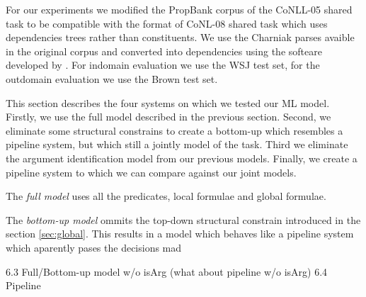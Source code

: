 
For our experiments we modified the PropBank corpus of the CoNLL-05 shared task 
\citep{carreras05introduction} to be compatible with the format of CoNL-08 
shared task \citep{surdeanu08conll} which uses dependencies trees rather than 
constituents. We use the Charniak parses avaible in the original corpus and 
converted into dependencies using the softeare developed by 
\citet{johansson07conversion}. For indomain evaluation we use the WSJ test set, 
for the outdomain evaluation we use the Brown test set. 

This section describes the four systems on which we tested our ML model.
Firstly, we use the full model described in the previous section. Second, we 
eliminate some structural constrains to create a bottom-up which resembles a 
pipeline system, but which still a jointly model of the task. Third we eliminate 
the argument identification model from our previous models. Finally, we create a 
pipeline system to which we can compare against our joint models.

The \emph{full model} uses all the predicates, local formulae and global 
formulae. 

The \emph{bottom-up model} ommits the top-down structural constrain introduced 
in the section \ref{sec:global}. This results in a model which behaves like a 
pipeline system which aparently pases the decisions mad  


6.3 Full/Bottom-up model w/o isArg (what about pipeline w/o isArg)
6.4 Pipeline
